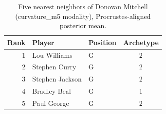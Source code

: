 \begin{table}[htbp]
  \centering\small
  \begin{tabular}{rllc}
    \toprule
    Rank & Player & Position & Archetype \\
    \midrule
    1 & Lou Williams & G & 2 \\
    2 & Stephen Curry & G & 2 \\
    3 & Stephen Jackson & G & 2 \\
    4 & Bradley Beal & G & 1 \\
    5 & Paul George & G & 2 \\
    \bottomrule
  \end{tabular}
  \caption{Five nearest neighbors of Donovan Mitchell (curvature_m5 modality), Procrustes-aligned posterior mean.}
  \label{tab:Donovan_Mitchell_neighbors_curvature_m5}
\end{table}

